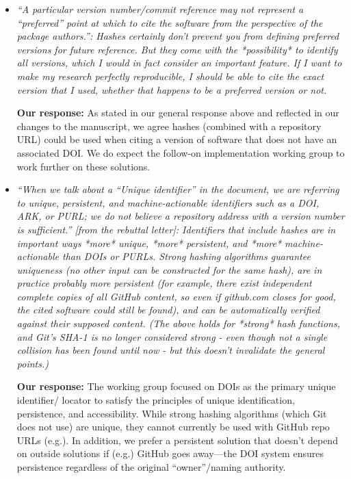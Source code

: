 \documentclass{article}
\begin{document}
\begin{enumerate}
\begin{itemize}
\item \emph{``A particular version number/commit reference may not represent a
``preferred'' point at which to cite the software from the perspective of the
package authors.'': Hashes certainly don't prevent you from defining preferred
versions for future reference. But they come with the *possibility* to identify
all versions, which I would in fact consider an important feature. If I want to
make my research perfectly reproducible, I should be able to cite the exact
version that I used, whether that happens to be a preferred version or not.}

\textbf{Our response:}
As stated in our general response above and reflected in our changes to the
manuscript, we agree hashes (combined with a
repository URL) could be used when citing a version of software that does not
have an associated DOI.
We do expect the follow-on implementation working group to work further on these solutions.


\item \emph{``When we talk about a ``Unique identifier'' in the document, we
are referring to unique, persistent, and machine-actionable identifiers such as
a DOI, ARK, or PURL; we do not believe a repository address with a version
number is sufficient.'' [from the rebuttal letter]: Identifiers that include
hashes are in important ways *more* unique, *more* persistent, and *more*
machine-actionable than DOIs or PURLs. Strong hashing algorithms guarantee
uniqueness (no other input can be constructed for the same hash), are in
practice probably more persistent (for example, there exist independent
complete copies of all GitHub content, so even if github.com closes for good,
the cited software could still be found), and can be automatically verified
against their supposed content. (The above holds for *strong* hash functions,
and Git's SHA-1 is no longer considered strong - even though not a single
collision has been found until now - but this doesn't invalidate the general
points.)}

\textbf{Our response:}
The working group focused on DOIs as the primary unique identifier\slash
locator to satisfy the principles of unique identification, persistence, and
accessibility. While strong hashing algorithms (which Git does not use) are
unique, they cannot currently be used with GitHub repo URLs (e.g.). In addition,
we prefer a persistent solution that doesn't depend on outside solutions if
(e.g.) GitHub goes away---the DOI system ensures persistence regardless of the
original ``owner''\slash naming authority.

\end{itemize}

\end{enumerate}

%
%
\end{document}
